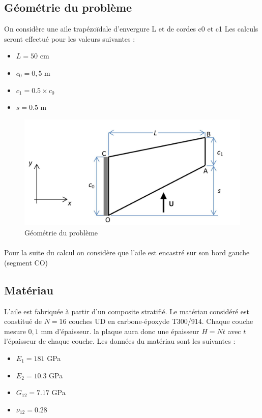 \documentclass[12pt,a4paper]{article}
\begin{document}
\subsection{Géométrie du problème}
On considère une aile trapézoïdale d'envergure L et de cordes c0 et c1
Les calculs seront effectué pour les valeurs suivantes :
\begin{itemize}
\item $L=50$ cm
\item $c_0=0,5$ m
\item $c_1=0.5\times c_0$
\item $s=0.5$ m
\end{itemize} 
\begin{figure}[h]
\includegraphics[scale=0.3]{images/geometrie.jpg} \centering
\caption{Géométrie du problème}
\end{figure}
\paragraph{}Pour la suite du calcul on considère que l'aile est encastré sur son bord gauche (segment CO)
\subsection{Matériau}
L'aile est fabriquée à partir d'un composite stratifié. Le matériau considéré est constitué de $N=16$ couches UD en carbone-époxyde T300/914. Chaque couche mesure $0,1$ mm d'épaisseur. la plaque aura donc une épaisseur $H = Nt$ avec $t$ l'épaisseur de chaque couche.
Les données du matériau sont les suivantes :
\begin{itemize}
\item $E_1=181$ GPa
\item $E_2=10.3$ GPa
\item $G_{12}=7.17$ GPa
\item $\nu_{12}=0.28$
\end{itemize}
\end{document}
